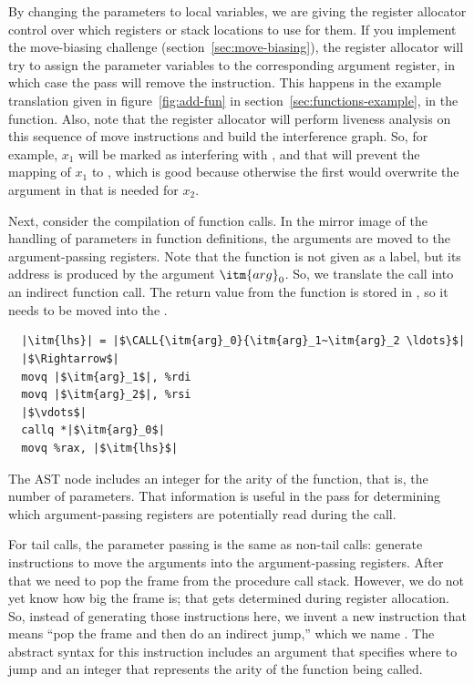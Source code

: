 \documentclass[7x10]{TimesAPriori_MIT}%
\numberwithin{theorem}{chapter}
\numberwithin{definition}{chapter}
\numberwithin{equation}{chapter}
\begin{document}
By changing the parameters to local variables, we are giving the
register allocator control over which registers or stack locations to
use for them. If you implement the move-biasing challenge
(section~\ref{sec:move-biasing}), the register allocator will try to
assign the parameter variables to the corresponding argument register,
in which case the  pass will remove the
 instruction. This happens in the example translation given
in figure~\ref{fig:add-fun} in section~\ref{sec:functions-example}, in
the  function.
%
Also, note that the register allocator will perform liveness analysis
on this sequence of move instructions and build the interference
graph. So, for example, $x_1$ will be marked as interfering with
, and that will prevent the mapping of $x_1$ to ,
which is good because otherwise the first  would overwrite
the argument in  that is needed for $x_2$.

Next, consider the compilation of function calls. In the mirror image
of the handling of parameters in function definitions, the arguments
are moved to the argument-passing registers.  Note that the function
is not given as a label, but its address is produced by the argument
$\itm{arg}_0$. So, we translate the call into an indirect function
call. The return value from the function is stored in , so
it needs to be moved into the .
\begin{lstlisting}
  |\itm{lhs}| = |$\CALL{\itm{arg}_0}{\itm{arg}_1~\itm{arg}_2 \ldots}$|
  |$\Rightarrow$|
  movq |$\itm{arg}_1$|, %rdi
  movq |$\itm{arg}_2$|, %rsi
  |$\vdots$|
  callq *|$\itm{arg}_0$|
  movq %rax, |$\itm{lhs}$|
\end{lstlisting}
The  AST node includes an integer for the arity of
the function, that is, the number of parameters. That information is
useful in the  pass for determining which
argument-passing registers are potentially read during the call.

For tail calls, the parameter passing is the same as non-tail calls:
generate instructions to move the arguments into the argument-passing
registers.  After that we need to pop the frame from the procedure
call stack.  However, we do not yet know how big the frame is; that
gets determined during register allocation. So, instead of generating
those instructions here, we invent a new instruction that means ``pop
the frame and then do an indirect jump,'' which we name
. The abstract syntax for this instruction includes an
argument that specifies where to jump and an integer that represents
the arity of the function being called.
\end{document}
